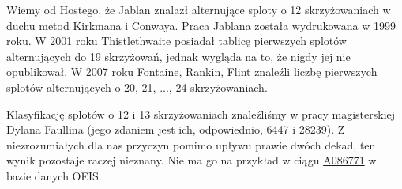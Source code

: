 Wiemy od Hostego, że Jablan \cite{jablan99} znalazł alternujące sploty o 12 skrzyżowaniach w duchu metod Kirkmana i Conwaya.
%
Praca Jablana została wydrukowana w 1999 roku.
W 2001 roku Thistlethwaite posiadał tablicę pierwszych splotów alternujących do 19 skrzyżowań, jednak wygląda na to, że nigdy jej nie opublikował.
%
W 2007 roku Fontaine, Rankin, Flint znaleźli liczbę pierwszych splotów alternujących o 20, 21, ..., 24 skrzyżowaniach.
%
%
%

Klasyfikację splotów o 12 i 13 skrzyżowaniach znaleźliśmy w pracy magisterskiej Dylana Faullina (jego zdaniem jest ich, odpowiednio, 6447 i 28239).
%
Z niezrozumiałych dla nas przyczyn pomimo upływu prawie dwóch dekad, ten wynik pozostaje raczej nieznany.
Nie ma go na przykład w ciągu \href{https://oeis.org/A086771}{A086771} w bazie danych OEIS.

